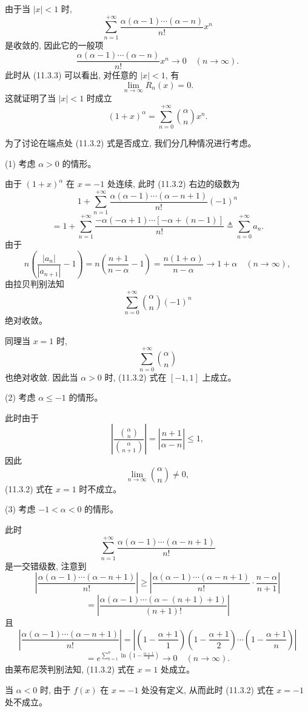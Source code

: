 \documentclass[UTF8,12pt,a4paper,fontset=fandol]{ctexart}
\begin{document}
由于当 $|x|<1$ 时,
\[
  \sum_{n=1}^{+\infty}
  \frac{\alpha(\alpha-1)\cdots(\alpha-n)}{n!}x^n
\]
是收敛的, 因此它的一般项
\[
  \frac{\alpha(\alpha-1)\cdots(\alpha-n)}{n!}x^n
  \to0\quad(n\to\infty).
\]
此时从 (11.3.3) 可以看出, 对任意的 $|x|<1$, 有
\[
  \lim_{n\to\infty}R_n(x)=0.
\]
这就证明了当 $|x|<1$ 时成立
\[
  (1+x)^\alpha=\sum_{n=0}^{+\infty}\binom{\alpha}{n}x^n.
\]

为了讨论在端点处 (11.3.2) 式是否成立, 我们分几种情况进行考虑。

(1) 考虑 $\alpha>0$ 的情形。

由于 $(1+x)^\alpha$ 在 $x=-1$ 处连续, 此时 (11.3.2) 右边的级数为
\[
  1+\sum_{n=1}^{+\infty}
  \frac{\alpha(\alpha-1)\cdots(\alpha-n+1)}{n!}(-1)^n
\]
\[
  =
  1+\sum_{n=1}^{+\infty}
  \frac{-\alpha(-\alpha+1)\cdots[-\alpha+(n-1)]}{n!}
  \triangleq
  \sum_{n=0}^{+\infty}a_n.
\]
由于
\[
  n\left(\frac{|a_n|}{|a_{n+1}|}-1\right)
  =
  n\left(\frac{n+1}{n-\alpha}-1\right)
  =
  \frac{n(1+\alpha)}{n-\alpha}
  \to1+\alpha\quad(n\to\infty),
\]
由拉贝判别法知
\[
  \sum_{n=0}^{+\infty}\binom{\alpha}{n}(-1)^n
\]
绝对收敛。

同理当 $x=1$ 时,
\[
  \sum_{n=0}^{+\infty}\binom{\alpha}{n}
\]
也绝对收敛. 因此当 $\alpha>0$ 时, (11.3.2) 式在 $[-1,1]$ 上成立。

(2) 考虑 $\alpha\leqslant-1$ 的情形。

此时由于
\[
  \left|
    \frac{\binom{\alpha}{n}}{\binom{\alpha}{n+1}}
  \right|
  =
  \left|\frac{n+1}{\alpha-n}\right|
  \leqslant1,
\]
因此
\[
  \lim_{n\to\infty}\binom{\alpha}{n}\ne0,
\]
(11.3.2) 式在 $x=1$ 时不成立。

(3) 考虑 $-1<\alpha<0$ 的情形。

此时
\[
  \sum_{n=1}^{+\infty}
  \frac{\alpha(\alpha-1)\cdots(\alpha-n+1)}{n!}
\]
是一交错级数, 注意到
\[
  \left|
    \frac{\alpha(\alpha-1)\cdots(\alpha-n+1)}{n!}
  \right|
  \geqslant
  \left|
    \frac{\alpha(\alpha-1)\cdots(\alpha-n+1)}{n!}
    \cdot\frac{n-\alpha}{n+1}
  \right|
\]
\[
  =
  \left|
    \frac{\alpha(\alpha-1)\cdots(\alpha-(n+1)+1)}{(n+1)!}
  \right|
\]
且
\[
  \left|
    \frac{\alpha(\alpha-1)\cdots(\alpha-n+1)}{n!}
  \right|
  =
  \left|
    \left(1-\frac{\alpha+1}{1}\right)
    \left(1-\frac{\alpha+1}{2}\right)
    \cdots
    \left(1-\frac{\alpha+1}{n}\right)
  \right|
\]
\[
  =
  e^{\sum_{k=1}^{n}\ln\left(1-\frac{\alpha+1}{k}\right)}
  \to0\quad(n\to\infty).
\]
由莱布尼茨判别法知, (11.3.2) 式在 $x=1$ 处成立。

当 $\alpha<0$ 时, 由于 $f(x)$ 在 $x=-1$ 处没有定义, 从而此时 (11.3.2) 式在 $x=-1$ 处不成立。
\end{document}
